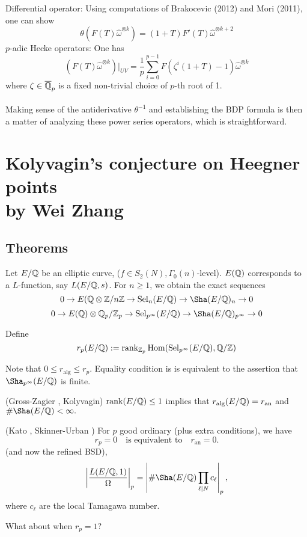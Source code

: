\documentclass[12pt,amsfont]{amsart}
\begin{document}
Differential operator: Using computations of Brakocevic  (2012) and Mori  (2011), one can show
\[\theta(F(T)\widehat{\omega}^{\otimes k}) = (1 + T)F'(T)\widehat{\omega}^{\otimes k + 2}\]
$p$-adic Hecke operators: One has
\[(F(T) \widehat{\omega}^{\otimes k})|_{UV} = \frac{1}{p} \sum_{i=0}^{p-1} F(\zeta^i(1 + T) - 1)\widehat{\omega}^{\otimes k}\]
where $\zeta \in \overline{{\mathbb Q}}_p$ is a fixed non-trivial choice of $p$-th root of 1. \\ \\
Making sense of the antiderivative $\theta^{-1}$ and establishing the BDP formula is then a matter of analyzing these power series operators, which is straightforward.  
\renewcommand{\thesubsection}{\arabic{section}.R}
\begingroup
\renewcommand{\addcontentsline}[3]{}%
\endgroup

\newpage
\section{Kolyvagin's conjecture on Heegner points \\
by Wei Zhang}\label{12}
\renewcommand{\thesubsection}{\arabic{section}.\arabic{subsection}}

\subsection{Theorems}

Let $E/{\mathbb Q}$ be an elliptic curve, ($f \in S_2(N), \Gamma_0(n)$-level). $E({\mathbb Q})$ corresponds to a $L$-function, say $L(E/{\mathbb Q}, s)$. For $n \geq 1$, we obtain the exact sequences
\[0 \rightarrow E(\bQ \otimes \bZ/n\bZ \rightarrow \Sel_n(E/\bQ) \rightarrow \Sha(E/\bQ)_n \rightarrow 0 \]
\[0 \rightarrow E(\bQ) \otimes \bQ_p/\bZ_p \rightarrow \Sel_{p^\infty}(E/\bQ) \rightarrow \Sha(E/\bQ)_{p^\infty} \rightarrow 0\]

Define
\[r_p(E/{\mathbb Q}) := \operatorname{rank}_{{\mathbb Z}_p} \operatorname{Hom}(\operatorname{Sel}_{p^\infty} (E/{\mathbb Q}), {\mathbb Q}/{\mathbb Z})\]

Note that $0 \leq r_{\text{alg}} \leq r_p$. Equality condition is is equivalent to the assertion that $\Sha_{p^\infty}(E/\bQ)$ is finite. 

\begin{thm} (Gross-Zagier , Kolyvagin) $\operatorname{rank}(E/{\mathbb Q}) \leq 1$ implies that $r_{\text{alg}} (E/{\mathbb Q}) = r_{\text{an}}$ and $\# \Sha(E/\bQ) < \infty.$ 
\end{thm}

\begin{thm} (Kato , Skinner-Urban ) For $p$ good ordinary (plus extra conditions), we have
\[r_p = 0\quad \text{is equivalent to}\quad r_{\text{an}} = 0. \]
(and now the refined BSD),
\[\left \vert \frac{L(E/\bQ, 1)}{\Omega}\right \rvert_p = \left \lvert \#\Sha(E/\bQ) \prod_{\ell | N} c_\ell \right \rvert_p, \]
where $c_\ell$ are the local Tamagawa number. 
\end{thm}
What about when $r_p = 1$?
\end{document}
